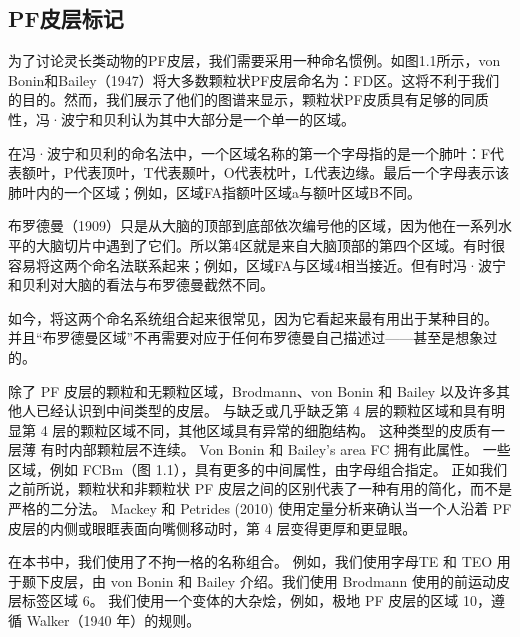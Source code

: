 \subsection{PF皮层标记}
为了讨论灵长类动物的PF皮层，我们需要采用一种命名惯例。如图1.1所示，von Bonin和Bailey（1947）将大多数颗粒状PF皮层命名为：FD区。这将不利于我们的目的。然而，我们展示了他们的图谱来显示，颗粒状PF皮质具有足够的同质性，冯·波宁和贝利认为其中大部分是一个单一的区域。
\par
在冯·波宁和贝利的命名法中，一个区域名称的第一个字母指的是一个肺叶：F代表额叶，P代表顶叶，T代表颞叶，O代表枕叶，L代表边缘。最后一个字母表示该肺叶内的一个区域；例如，区域FA指额叶区域a与额叶区域B不同。
\par
布罗德曼（1909）只是从大脑的顶部到底部依次编号他的区域，因为他在一系列水平的大脑切片中遇到了它们。所以第4区就是来自大脑顶部的第四个区域。有时很容易将这两个命名法联系起来；例如，区域FA与区域4相当接近。但有时冯·波宁和贝利对大脑的看法与布罗德曼截然不同。
\par
如今，将这两个命名系统组合起来很常见，因为它看起来最有用出于某种目的。 并且“布罗德曼区域”不再需要对应于任何布罗德曼自己描述过——甚至是想象过的。
\par
除了 PF 皮层的颗粒和无颗粒区域，Brodmann、von Bonin 和 Bailey 以及许多其他人已经认识到中间类型的皮层。 与缺乏或几乎缺乏第 4 层的颗粒区域和具有明显第 4 层的颗粒区域不同，其他区域具有异常的细胞结构。 这种类型的皮质有一层薄
有时内部颗粒层不连续。 Von Bonin 和 Bailey's area FC 拥有此属性。 一些区域，例如 FCBm（图 1.1），具有更多的中间属性，由字母组合指定。 正如我们之前所说，颗粒状和非颗粒状 PF 皮层之间的区别代表了一种有用的简化，而不是严格的二分法。 Mackey 和 Petrides (2010) 使用定量分析来确认当一个人沿着 PF 皮层的内侧或眼眶表面向嘴侧移动时，第 4 层变得更厚和更显眼。
\par
在本书中，我们使用了不拘一格的名称组合。 例如，我们使用字母TE 和 TEO 用于颞下皮层，由 von Bonin 和 Bailey 介绍。我们使用 Brodmann 使用的前运动皮层标签区域 6。 我们使用一个变体的大杂烩，例如，极地 PF 皮层的区域 10，遵循 Walker（1940 年）的规则。
